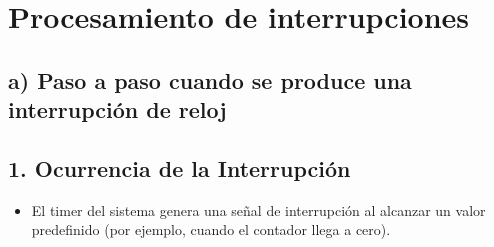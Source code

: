 \documentclass{article}
\begin{document}
\section{Procesamiento de interrupciones}

\subsection*{a) Paso a paso cuando se produce una interrupción de reloj}

\subsection*{1. Ocurrencia de la Interrupción}
\begin{itemize}
    \item El timer del sistema genera una señal de interrupción al alcanzar un valor predefinido (por ejemplo, cuando el contador llega a cero).
\end{itemize}
\end{document}
